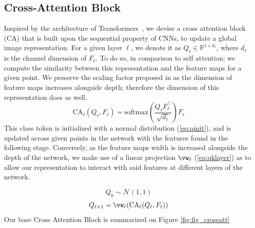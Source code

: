 \subsection{Cross-Attention Block}
\label{subsec:CA-base}
Inspired by the architecture of Transformers~\cite{NIPS2017_3f5ee243}, we devise a cross attention block (CA) that is built upon the sequential property of CNNs, to update a global image representation. For a given layer $\ell$, we denote it  as $Q_\ell \in \mathbb{R}^{1 \times d_\ell}$, where $d_\ell$ is the channel dimension of $F_\ell$. To do so, in comparison to self attention; we compute the similarity between this representation and the feature maps for a given point. We preserve the scaling factor proposed in \cite{NIPS2017_3f5ee243} as the dimension of feature maps increases alongside depth; therefore the dimension of this representation does as well.
\begin{equation}
    \mbox{CA}_\ell(Q_{\ell}, F_{\ell}) = \mbox{softmax}(\frac{Q_{\ell}F^\top_{\ell}}{\sqrt{d_\ell}})F_{\ell}
    \label{eq:CA-base}
\end{equation}
This class token is initialized with a normal distribution (\ref{eq:qinit}), and is updated across given points in the network with the features found in the following stage. Conversely, as the feature maps width is increased alongside the depth of the network, we make use of a linear projection $\vw_\ell$ (\ref{eq:qklayer}) as to allow our representation to interact with said features at different layers of the network. 

\begin{equation}
    Q_0 \sim \mathcal{N}(1, 1) 
    \label{eq:qinit}
\end{equation}
\begin{equation}    
    Q_{\ell+1} = \vw_\ell(\mbox{CA}_{\ell}(Q_{\ell}, F_{\ell}))
    \label{eq:qklayer}
\end{equation}
Our base Cross Attention Block is summarized on Figure \ref{fig:fig_crossatt}%


